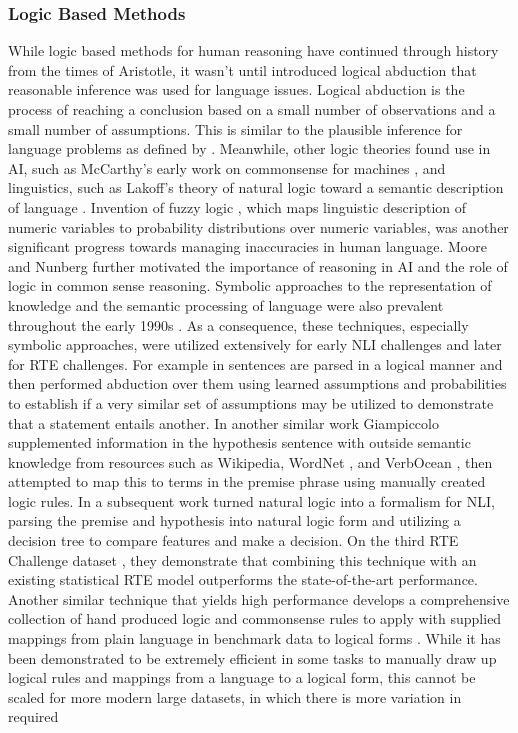\subsubsection{Logic Based Methods}
\label{rte_methods_logic}


While logic based methods for human reasoning have continued through history from the times of Aristotle, it wasn't until \citep{peirce1883theory} introduced logical abduction that reasonable inference was used for language issues. Logical abduction is the process of reaching a conclusion based on a small number of observations and a small number of assumptions. This is similar to the plausible inference for language problems as defined by \citep{davis2015commonsense}. Meanwhile, other logic theories found use in AI, such as McCarthy's early work on commonsense for machines \citep{mccarthy1960programs}, and linguistics, such as Lakoff's theory of natural logic toward a semantic description of language \citep{lakoff1970linguistics}. Invention of fuzzy logic \citep{zadeh1988fuzzy}, which maps linguistic description of numeric variables to probability distributions over numeric variables, was another significant progress towards managing inaccuracies in human language. Moore \citep{moore1982role} and Nunberg \citep{nunberg1987position} further motivated the importance of reasoning in AI and the role of logic in common sense reasoning. Symbolic approaches to the representation of knowledge and the semantic processing of language were also prevalent throughout the early 1990s \citep{birnbaum1991rigor}. As a consequence, these techniques, especially symbolic approaches, were utilized extensively for early NLI challenges and later for RTE challenges. For example in \citep{raina2005robust} sentences are parsed in a logical manner and then performed abduction over them using learned assumptions and probabilities to establish if a very similar set of assumptions may be utilized to demonstrate that a statement entails another. In another similar work Giampiccolo \citep{giampiccolo2008fourth} supplemented information in the hypothesis sentence with outside semantic knowledge from resources such as Wikipedia, WordNet \citep{miller1995wordnet}, and VerbOcean \citep{chklovski2004verbocean}, then attempted to map this to terms in the premise phrase using manually created logic rules. In a subsequent work \citep{maccartney2007natural} turned natural logic into a formalism for NLI, parsing the premise and hypothesis into natural logic form and utilizing a decision tree to compare features and make a decision. On the third RTE Challenge dataset \citep{giampiccolo2007third}, they demonstrate that combining this technique with an existing statistical RTE model outperforms the state-of-the-art performance. Another similar technique that yields high performance develops a comprehensive collection of hand produced logic and commonsense rules to apply with supplied mappings from plain language in benchmark data to logical forms \citep{gordon2016commonsense}. While it has been demonstrated to be extremely efficient in some tasks to manually draw up logical rules and mappings from a language to a logical form, this cannot be scaled for more modern large datasets, in which there is more variation in required 